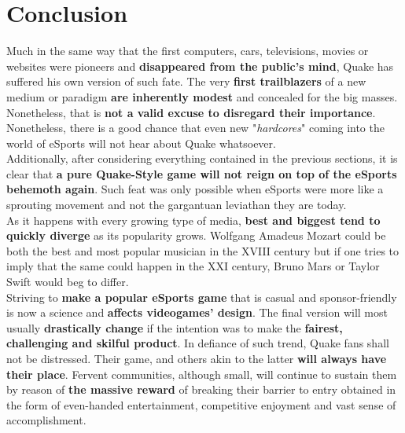\section{Conclusion}
\label{sec:conclusion}

Much in the same way that the first computers, cars, televisions, movies or websites were pioneers and \textbf{disappeared from the public's mind}, Quake has suffered his own version of such fate. The very \textbf{first trailblazers} of a new medium or paradigm \textbf{are inherently modest} and concealed for the big masses. Nonetheless, that is \textbf{not a valid excuse to disregard their importance}. Nonetheless, there is a good chance that even new "\textit{hardcores}" coming into the world of eSports will not hear about Quake whatsoever.\\

Additionally, after considering everything contained in the previous sections, it is clear that \textbf{a pure Quake-Style game will not reign on top of the eSports behemoth again}. Such feat was only possible when eSports were more like a sprouting movement and not the gargantuan leviathan they are today.\\

As it happens with every growing type of media, \textbf{best and biggest tend to quickly diverge} as its popularity grows. Wolfgang Amadeus Mozart could be both the best and most popular musician in the XVIII century but if one tries to imply that the same could happen in the XXI century, Bruno Mars or Taylor Swift would beg to differ.\\

Striving to \textbf{make a popular eSports game} that is casual and sponsor-friendly is now a science and \textbf{affects videogames' design}. The final version will most usually \textbf{drastically change} if the intention was to make the \textbf{fairest, challenging and skilful product}. In defiance of such trend, Quake fans shall not be distressed. Their game, and others akin to the latter \textbf{will always have their place}. Fervent communities, although small, will continue to sustain them by reason of \textbf{the massive reward} of breaking their barrier to entry obtained in the form of even-handed entertainment, competitive enjoyment and vast sense of accomplishment.\\